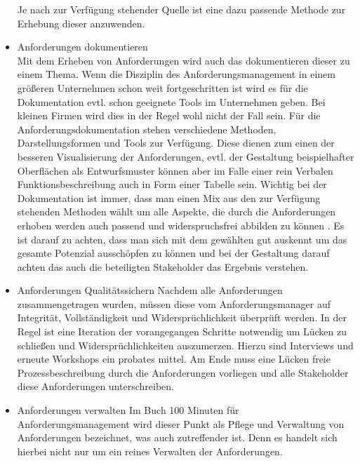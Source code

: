 \begin{itemize}
		Je nach zur Verfügung stehender Quelle ist eine dazu passende Methode zur Erhebung 
		dieser anzuwenden.
		
\item Anforderungen dokumentieren\\
		Mit dem Erheben von Anforderungen wird auch das dokumentieren dieser zu einem Thema. 
		Wenn die Disziplin des Anforderungsmanagement in einem größeren Unternehmen schon weit
		fortgeschritten ist wird es für die Dokumentation evtl. schon geeignete Tools im 
		Unternehmen geben. Bei kleinen Firmen wird dies in der Regel wohl nicht der Fall sein.
		Für die Anforderungsdokumentation stehen verschiedene Methoden, Darstellungsformen und 
		Tools zur Verfügung. Diese dienen zum einen der besseren Visualisierung der 
		Anforderungen, evtl. der Gestaltung beispielhafter Oberflächen als Entwurfsmuster 
		können aber im Falle einer rein Verbalen Funktionsbeschreibung auch in Form einer 
		Tabelle sein. Wichtig bei der Dokumentation ist immer, dass man einen Mix aus den zur 
		Verfügung stehenden Methoden wählt um alle Aspekte, die durch die Anforderungen erhoben 
		werden auch passend und widerspruchsfrei abbilden zu können
		\autocite[93-137]{AMin.sieben.T}. Es ist darauf zu achten, dass man sich mit dem gewählten 
		gut auskennt um das gesamte Potenzial ausschöpfen zu können und bei der Gestaltung darauf 
		achten das auch die beteiligten Stakeholder das Ergebnis verstehen.
		
		
\item Anforderungen Qualitätssichern
		Nachdem alle Anforderungen zusammengetragen wurden, müssen diese vom Anforderungsmanager 
		auf Integrität, Vollständigkeit und Widersprüchlichkeit überprüft werden. In der Regel ist 
		eine Iteration der vorangegangen Schritte notwendig um Lücken zu schließen und 
		Widersprüchlichkeiten auszumerzen. Hierzu sind Interviews und erneute Workshops ein 		
		probates mittel. Am Ende muss eine Lücken freie Prozessbeschreibung durch die Anforderungen vorliegen
		und alle Stakeholder diese Anforderungen unterschreiben.
	
\item Anforderungen verwalten
		Im Buch 100 Minuten für Anforderungsmanagement\autocite[103]{100minAM} wird dieser Punkt als
		Pflege und Verwaltung von Anforderungen bezeichnet, was auch zutreffender ist. Denn es
		handelt sich hierbei nicht nur um ein reines Verwalten der Anforderungen. 
			

\end{itemize}
